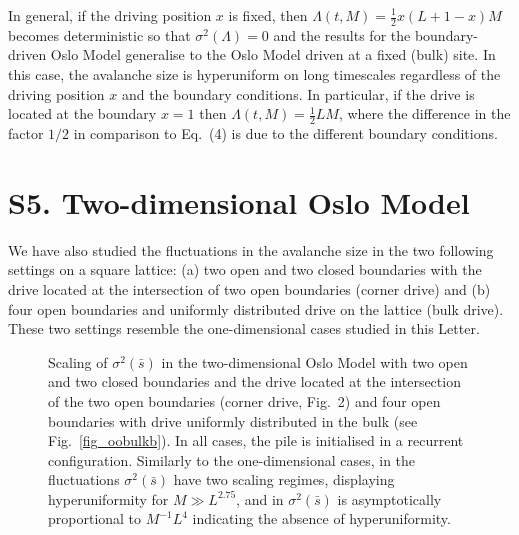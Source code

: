 \documentclass[doublecol]{epl2}
\newcommand{\Eref}[1]{Eq.~(\ref{eq:#1})}
\newcommand{\Figref}[1]{Fig.~\ref{fig_#1}}
\newcommand{\bungledXR}[2]{#2}
\begin{document}
In general, if the driving position $x$ is fixed, then $\Lambda(t,M)=\frac{1}{2}x(L+1-x)M$ becomes deterministic so that $\sigma^2(\Lambda)=0$ and the results for the boundary-driven Oslo Model generalise to the Oslo Model driven at a fixed (bulk) site. In this case, the avalanche size is hyperuniform on long timescales regardless of the driving position $x$ and the boundary conditions. In particular, if the drive is located at the boundary $x=1$ then $\Lambda(t,M)=\frac{1}{2}LM$, where the difference in the factor $1/2$ in comparison to \bungledXR{\Eref{eq_SM}}{Eq.~(4)} is due to the different boundary conditions.
 

\section{S5. Two-dimensional Oslo Model}
\label{sect_app_2d}
We have also studied the fluctuations in the avalanche size in the two following settings on a square lattice: (a) two open and two closed boundaries with the drive located at the intersection of two open boundaries (corner drive) and (b) four open boundaries and uniformly distributed drive on the lattice (bulk drive). These two settings resemble the one-dimensional cases studied in this Letter.

\begin{figure}
\centering
{}
\caption{ \label{fig_2d} Scaling of $\sigma^2(\bar{s})$ in the two-dimensional Oslo Model with  two open and two closed boundaries and the drive located at the intersection of the two open boundaries (corner drive, \cf \bungledXR{\Figref{Dx}}{Fig.~2}) and  four open boundaries with drive uniformly distributed in the bulk (see \Figref{oobulkb}). In all cases, the pile is initialised in a recurrent configuration. Similarly to the one-dimensional cases, in  the fluctuations $\sigma^2(\bar{s})$ have two scaling regimes, displaying hyperuniformity for $M\gg L^{2.75}$, and in  $\sigma^2(\bar{s})$ is asymptotically proportional to $M^{-1}L^4$ indicating the absence of hyperuniformity.}
\end{figure}
\end{document}
